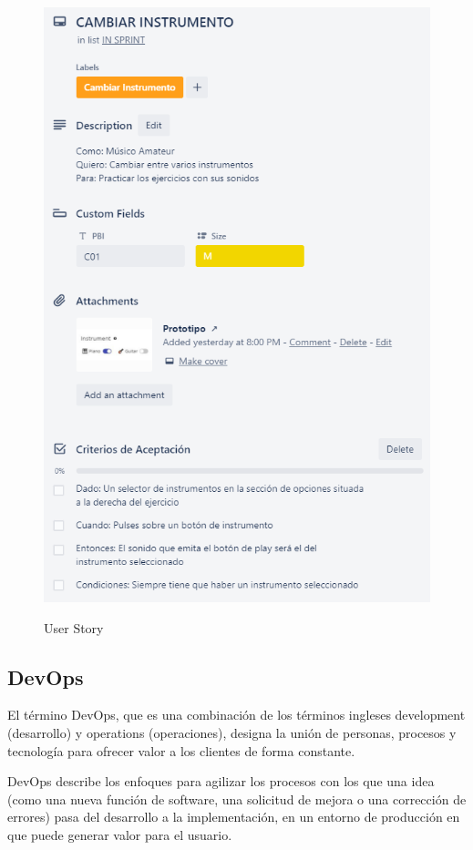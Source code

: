 \documentclass[12pt,twoside,titlepage]{report}
\begin{document}
\begin{figure}[H]
    \centering
    \includegraphics[scale=0.7]{USERSTORY}
    \label{fig:UserStory}
    \caption{User Story}
\end{figure}

\subsection{DevOps}

El término DevOps, que es una combinación de los términos ingleses development (desarrollo) y operations (operaciones), designa la unión de personas, procesos y tecnología para ofrecer valor a los clientes de forma constante.

DevOps describe los enfoques para agilizar los procesos con los que una idea (como una nueva función de software, una solicitud de mejora o una corrección de errores) pasa del desarrollo a la implementación, en un entorno de producción en que puede generar valor para el usuario.
\end{document}
